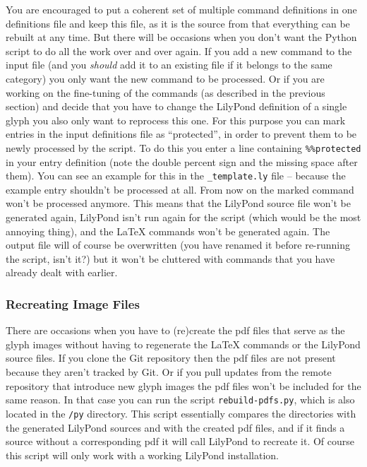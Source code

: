 \documentclass{article}
\begin{document}
You are encouraged to put a coherent set of multiple command definitions in one definitions file and keep this file, as it is the source from that everything can be rebuilt at any time.
But there will be occasions when you don't want the Python script to do all the work over and over again.
If you add a new command to the input file (and you \emph{should} add it to an existing file if it belongs to the same category) you only want the new command to be processed.
Or if you are working on the fine-tuning of the commands (as described in the previous section) and decide that you have to change the LilyPond definition of a single glyph you also only want to reprocess this one.
For this purpose you can mark entries in the input definitions file as “protected”, in order to prevent them to be newly processed by the script.
To do this you enter a line containing \verb|%%protected| in your entry definition (note the double percent sign and the missing space after them).
You can see an example for this in the \texttt{\_template.ly} file -- because the example entry shouldn't be processed at all.
From now on the marked command won't be processed anymore.
This means that the LilyPond source file won't be generated again, LilyPond isn't run again for the script (which would be the most annoying thing), and the \LaTeX{} commands won't be generated again.
The output file will of course be overwritten (you have renamed it before re-running the script, isn't it?) but it won't be cluttered with commands that you have already dealt with earlier.


\subsubsection{Recreating Image Files}
\label{subsubsec:BGI_recreating_images}

There are occasions when you have to (re)create the pdf files that serve as the glyph images without having to regenerate the \LaTeX{} commands or the LilyPond source files.
If you clone the Git repository then the pdf files are not present because they aren't tracked by Git.
Or if you pull updates from the remote repository that introduce new glyph images the pdf files won't be included for the same reason.
In that case you can run the script \texttt{rebuild-pdfs.py}, which is also located in the \texttt{/py} directory.
This script essentially compares the directories with the generated LilyPond sources and with the created pdf files, and if it finds a source without a corresponding pdf it will call LilyPond to recreate it.
Of course this script will only work with a working LilyPond installation.
\end{document}

